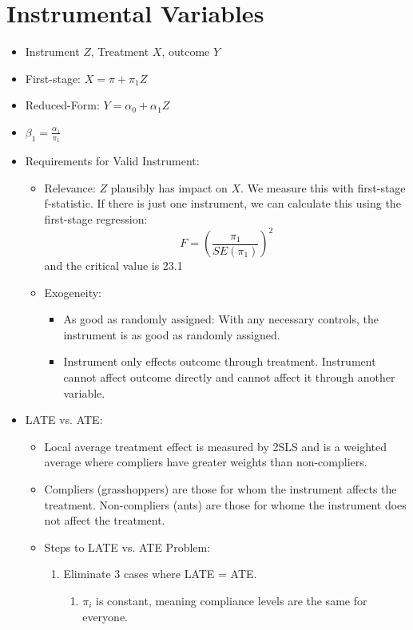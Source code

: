 \documentclass{article}
\begin{document}
\section{Instrumental Variables}
\begin{itemize}
    \item Instrument $Z$, Treatment $X$, outcome $Y$
    \item First-stage: $X = \pi + \pi_1 Z$
    \item Reduced-Form: $Y = \alpha_0 + \alpha_1 Z$
    \item $\beta_1 = \frac{\alpha_1}{\pi_1}$
    \item Requirements for Valid Instrument:
    \begin{itemize}
        \item Relevance: $Z$ plausibly has impact on $X$. We measure this with first-stage f-statistic. If there is just one instrument, we can calculate this using the first-stage regression: $$F = \left(\frac{\pi_1}{SE(\pi_1)}\right)^2$$ and the critical value is 23.1
        \item Exogeneity:
        \begin{itemize}
            \item As good as randomly assigned: With any necessary controls, the instrument is as good as randomly assigned.
            \item Instrument only effects outcome through treatment. Instrument cannot affect outcome directly and cannot affect it through another variable.
        \end{itemize}
    \end{itemize}
    \item LATE vs. ATE: 
    \begin{itemize}
        \item Local average treatment effect is measured by 2SLS and is a weighted average where compliers have greater weights than non-compliers.
        \item Compliers (grasshoppers) are those for whom the instrument affects the treatment. Non-compliers (ants) are those for whome the instrument does not affect the treatment.
        \item Steps to LATE vs. ATE Problem:
        \begin{enumerate}
            \item Eliminate 3 cases where LATE = ATE. 
            \begin{enumerate}
                \item $\pi_i$ is constant, meaning compliance levels are the same for everyone.

\end{enumerate}
\end{enumerate}
\end{itemize}
\end{itemize}
\end{document}
